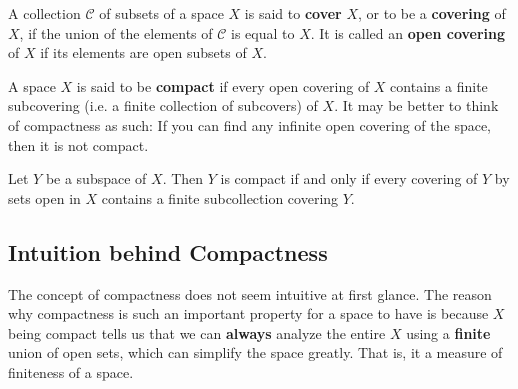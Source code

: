 \documentclass{article}
\begin{document}
    \begin{definition}
    A collection $\mathscr{C}$ of subsets of a space $X$ is said to \textbf{cover} $X$, or to be a \textbf{covering} of $X$, if the union of the elements of $\mathscr{C}$ is equal to $X$. It is called an \textbf{open covering} of $X$ if its elements are open subsets of $X$. 
    \end{definition}

    \begin{definition}
    A space $X$ is said to be \textbf{compact} if every open covering of $X$ contains a finite subcovering (i.e. a finite collection of subcovers) of $X$. It may be better to think of compactness as such: If you can find any infinite open covering of the space, then it is not compact. 
    \end{definition}

    \begin{lemma}
    Let $Y$ be a subspace of $X$. Then $Y$ is compact if and only if every covering of $Y$ by sets open in $X$ contains a finite subcollection covering $Y$. 
    \end{lemma}

  \subsection{Intuition behind Compactness}

    The concept of compactness does not seem intuitive at first glance. The reason why compactness is such an important property for a space to have is because $X$ being compact tells us that we can \textbf{always} analyze the entire $X$ using a \textbf{finite} union of open sets, which can simplify the space greatly. That is, it a measure of finiteness of a space. 
\end{document}

